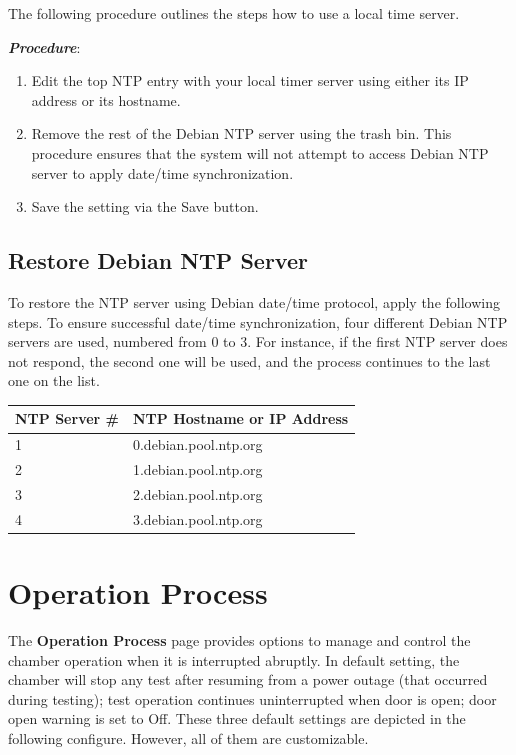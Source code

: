 The following procedure outlines the steps how to use a local time
server.

\textbf{\emph{Procedure}}:

\begin{enumerate}
\def\labelenumi{\arabic{enumi}.}
\tightlist
\item
  Edit the top NTP entry with your local timer server using either its
  IP address or its hostname.
\item
  Remove the rest of the Debian NTP server using the trash bin. This
  procedure ensures that the system will not attempt to access Debian
  NTP server to apply date/time synchronization.
\item
  Save the setting via the Save button.
\end{enumerate}


\subsection{Restore Debian NTP
Server}

To restore the NTP server using Debian date/time protocol, apply the
following steps. To ensure successful date/time synchronization, four
different Debian NTP servers are used, numbered from 0 to 3. For
instance, if the first NTP server does not respond, the second one will
be used, and the process continues to the last one on the list.

\begin{longtable}[]{@{}ll@{}}
\toprule
NTP Server \# & NTP Hostname or IP Address\tabularnewline
\midrule
\endhead
1 & 0.debian.pool.ntp.org\tabularnewline
2 & 1.debian.pool.ntp.org\tabularnewline
3 & 2.debian.pool.ntp.org\tabularnewline
4 & 3.debian.pool.ntp.org\tabularnewline
\bottomrule
\end{longtable}


\section{Operation Process}

The \textbf{Operation Process} page provides options to manage and
control the chamber operation when it is interrupted abruptly. In
default setting, the chamber will stop any test after resuming from a
power outage (that occurred during testing); test operation continues
uninterrupted when door is open; door open warning is set to Off. These
three default settings are depicted in the following configure. However,
all of them are customizable.

